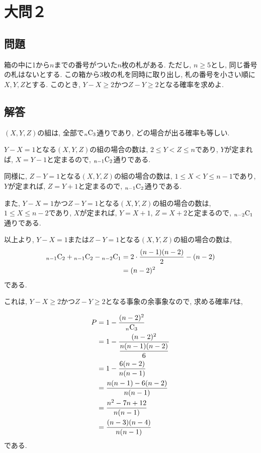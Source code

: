 \documentclass[dvipdfmx,a4paper]{jsarticle}
\begin{document}
    \section{大問２}
    \subsection{問題}
    箱の中に1から$n$までの番号がついた$n$枚の札がある. ただし, $n\geq 5$とし, 同じ番号の札はないとする. 
    この箱から3枚の札を同時に取り出し, 札の番号を小さい順に$X, Y, Z$とする. このとき, 
    $Y-X \geq 2$かつ$Z-Y \geq 2$となる確率を求めよ. 

    \subsection{解答}
    $(X,Y,Z)$の組は, 全部で${}_{n}\mathrm{C}_{3}$通りであり, どの場合が出る確率も等しい. 

    $Y-X=1$となる$(X,Y,Z)$の組の場合の数は, $2\leq Y <Z\leq n$であり, $Y$が定まれば, 
    $X=Y-1$と定まるので, ${}_{n-1}\mathrm{C}_{2}$通りである. 

    同様に, $Z-Y=1$となる$(X,Y,Z)$の組の場合の数は, $1\leq X< Y \leq n-1$であり, $Y$が定まれば, 
    $Z=Y+1$と定まるので, ${}_{n-1}\mathrm{C}_{2}$通りである. 

    また, $Y-X=1$かつ$Z-Y=1$となる$(X,Y,Z)$の組の場合の数は, 
    $1 \leq X \leq n-2$であり, $X$が定まれば, $Y=X+1$, $Z=X+2$と定まるので, 
    ${}_{n-2}\mathrm{C}_{1}$通りである. 

    以上より, $Y-X=1$または$Z-Y=1$となる$(X,Y,Z)$の組の場合の数は, 
    \begin{align*}
        {}_{n-1}\mathrm{C}_{2} + {}_{n-1}\mathrm{C}_{2} - {}_{n-2}\mathrm{C}_{1} &=
        2 \cdot \dfrac{(n-1)(n-2)}{2} - (n-2) \\
        &= (n-2)^2
    \end{align*}
    である. 

    これは, $Y-X \geq 2$かつ$Z-Y \geq 2$となる事象の余事象なので, 
    求める確率$P$は, 

    \begin{align*}
        P &= 1 - \dfrac{(n-2)^2}{{}_{n}\mathrm{C}_{3}} \\
        &= 1 - \dfrac{(n-2)^2}{\dfrac{n(n-1)(n-2)}{6}} \\
        &= 1 - \dfrac{6(n-2)}{n(n-1)} \\
        &= \dfrac{n(n-1) - 6(n-2)}{n(n-1)} \\
        &= \dfrac{n^2 -7n + 12}{n(n-1)} \\
        &= \dfrac{(n-3)(n-4)}{n(n-1)}
    \end{align*}
    である. 
\end{document}
